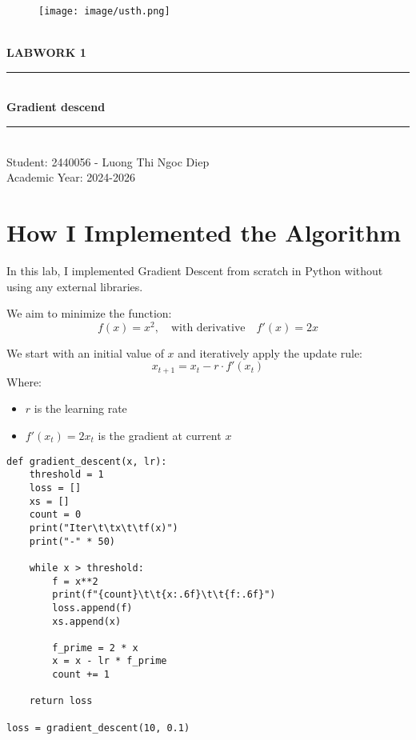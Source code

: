 \documentclass[hidelinks]{report}
\begin{document}
\begin{titlepage}
\begin{center}
\begin{figure}
    \centering
    \texttt{[image: image/usth.png]}
\end{figure}

\textsc{\Large }\\[1.5cm]

{\huge \bfseries \uppercase{Labwork 1} \\[3cm] }

\rule{\linewidth}{0.3mm} \\[0.4cm]
{ \huge \bfseries\color{blue} Gradient descend}
\rule{\linewidth}{0.3mm} \\[0.5cm]
\Large{Student:} 2440056 - Luong Thi Ngoc Diep\\[0.3cm]
\large Academic Year: 2024-2026
    
\end{center}
\end{titlepage}

\clearpage
\pagestyle{plain} 
\setcounter{page}{1}

\chapter{How I Implemented the Algorithm}

In this lab, I implemented Gradient Descent from scratch in Python without using any external libraries.

We aim to minimize the function:
\[
f(x) = x^2, \quad \text{with derivative} \quad f'(x) = 2x
\]

We start with an initial value of \( x \) and iteratively apply the update rule:
\[
x_{t+1} = x_t - r \cdot f'(x_t)
\]
Where:
\begin{itemize}
  \item \( r \) is the learning rate
  \item \( f'(x_t) = 2x_t \) is the gradient at current \( x \)
\end{itemize}

\begin{verbatim}
def gradient_descent(x, lr):
    threshold = 1
    loss = []
    xs = []
    count = 0  
    print("Iter\t\tx\t\tf(x)")
    print("-" * 50)

    while x > threshold:
        f = x**2
        print(f"{count}\t\t{x:.6f}\t\t{f:.6f}")
        loss.append(f)
        xs.append(x)

        f_prime = 2 * x
        x = x - lr * f_prime  
        count += 1

    return loss

loss = gradient_descent(10, 0.1)

\end{verbatim}
\end{document}
